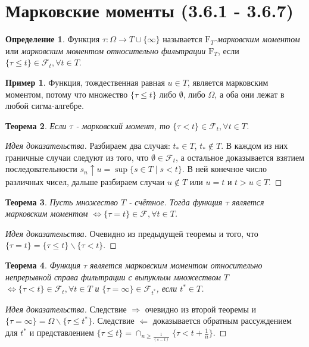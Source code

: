 \documentclass[16pt]{article}
\newtheorem{theorem}{Теорема}[section]
\theoremstyle{definition}
\newtheorem{definition}[theorem]{Определение}
\newtheorem{example}{Пример}[theorem]
\begin{document}
\section{Марковские моменты (3.6.1 - 3.6.7)}
\begin{definition}
Функция $\tau: \Omega \rightarrow T \cup \{\infty\}$ называется \textit{$\mathrm{F}_T$-марковским моментом} или \textit{марковским моментом относительно фильтрации $\mathrm{F}_T$}, если $\{\tau \le t\} \in \mathcal{F}_t, \forall t \in T$.
\end{definition}
\begin{example}
Функция, тождественная равная $u \in T$, является марковским моментом, потому что множество $\{\tau \le t\}$ либо $\emptyset$, либо $\Omega$, а оба они лежат в любой сигма-алгебре.
\end{example}
\begin{theorem}
Если $\tau$ - марковский момент, то $\{\tau < t\} \in \mathcal{F}_t, \forall t \in T$. 
\end{theorem}
\begin{proof}[Идея доказательства]
Разбираем два случая: $t_* \in T$, $t_* \notin T$. В каждом из них граничные случаи следуют из того, что $\emptyset \in \mathcal{F}_t$, а остальное доказывается взятием последовательности $s_n \uparrow u = \sup\{s \in T \mid s < t\}$. В ней конечное число различных чисел, дальше разбираем случаи $u \notin T$ или $u = t$ и $t > u \in T$. 
\end{proof}
\begin{theorem}
Пусть множество $T$ - счётное. Тогда функция $\tau$ является марковским моментом $\Longleftrightarrow \{\tau = t\} \in \mathcal{F}, \forall t \in T$.
\end{theorem}
\begin{proof}[Идея доказательства]
Очевидно из предыдущей теоремы и того, что $\{\tau = t\} = \{\tau \le t\} \backslash \{\tau < t\}$.
\end{proof}
\begin{theorem}
Функция $\tau$ является марковским моментом относительно непрерывной справа фильтрации с выпуклым множеством $T$ $\Longleftrightarrow \{\tau < t\} \in \mathcal{F}_t, \forall t \in T$ и $\{\tau = \infty\} \in \mathcal{F}_{t^*}$, если $t^* \in T$.
\end{theorem}
\begin{proof}[Идея доказательства]
Следствие $\Longrightarrow$ очевидно из второй теоремы и $\{\tau = \infty\} = \Omega \backslash \{\tau \le t^*\}$. \newline Следствие $\Longleftarrow$ доказывается обратным рассуждением для $t^*$ и представлением $\{\tau \le t\} = \cap_{n \ge \frac{1}{(s - t)}}\{\tau < t + \frac{1}{n}\}$.
\end{proof}
\end{document}

